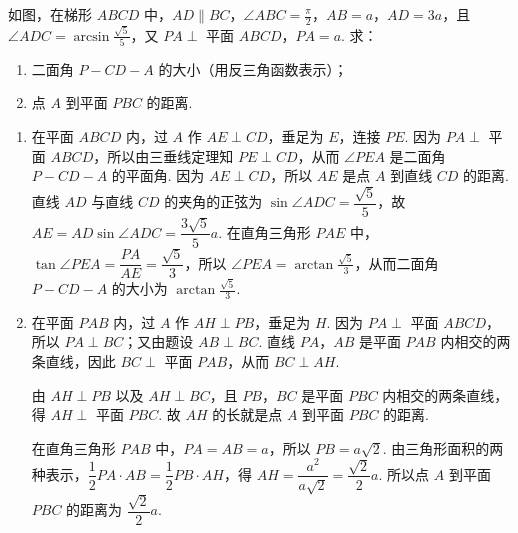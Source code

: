 \documentclass[UTF8,a4paper,oneside,11pt]{ctexbook}
\begin{document}
\begin{problem}
如图，在梯形 \(ABCD\) 中，\(AD \parallel BC\)，\(\angle ABC = \frac{\pi}{2}\)，\(AB = a\)，\(AD = 3a\)，且 \(\angle ADC = \arcsin \frac{\sqrt{5}}{5}\)，又 \(PA \perp\) 平面 \(ABCD\)，\(PA = a\). 求：

\begin{enumerate}
\item 二面角 \(P - CD - A\) 的大小（用反三角函数表示）；
\item 点 \(A\) 到平面 \(PBC\) 的距离.
\end{enumerate}

\end{problem}

\begin{solution}
\begin{enumerate}
\item 在平面 \(ABCD\) 内，过 \(A\) 作 \(AE \perp CD\)，垂足为 \(E\)，连接 \(PE\).
因为 \(PA \perp\) 平面 \(ABCD\)，所以由三垂线定理知 \(PE \perp CD\)，从而 \(\angle PEA\) 是二面角 \(P - CD - A\) 的平面角.
因为 \(AE\perp CD\)，所以 \(AE\) 是点 \(A\) 到直线 \(CD\) 的距离. 直线 \(AD\) 与直线 \(CD\) 的夹角的正弦为 \(\sin\angle ADC=\dfrac{\sqrt5}{5}\)，故 \(AE=AD\sin\angle ADC=\dfrac{3\sqrt5}{5}a\).
在直角三角形 \(PAE\) 中，\(\tan \angle PEA = \dfrac{PA}{AE} = \dfrac{\sqrt{5}}{3}\)，所以 \(\angle PEA = \arctan \frac{\sqrt{5}}{3}\)，从而二面角 \(P - CD - A\) 的大小为 \(\arctan \frac{\sqrt{5}}{3}\).

\item 在平面 \(PAB\) 内，过 \(A\) 作 \(AH \perp PB\)，垂足为 \(H\).
因为 \(PA \perp\) 平面 \(ABCD\)，所以 \(PA \perp BC\)；又由题设 \(AB \perp BC\). 直线 \(PA\)，\(AB\) 是平面 \(PAB\) 内相交的两条直线，因此 \(BC \perp\) 平面 \(PAB\)，从而 \(BC \perp AH\).

由 \(AH \perp PB\) 以及 \(AH \perp BC\)，且 \(PB\)，\(BC\) 是平面 \(PBC\) 内相交的两条直线，得 \(AH \perp\) 平面 \(PBC\). 故 \(AH\) 的长就是点 \(A\) 到平面 \(PBC\) 的距离.

在直角三角形 \(PAB\) 中，\(PA=AB=a\)，所以 \(PB=a\sqrt2\). 由三角形面积的两种表示，\(\dfrac12 PA\cdot AB=\dfrac12 PB\cdot AH\)，得 \(AH=\dfrac{a^2}{a\sqrt2}=\dfrac{\sqrt2}{2}a\). 所以点 \(A\) 到平面 \(PBC\) 的距离为 \(\dfrac{\sqrt2}{2}a\).
\end{enumerate}
\end{solution}
\end{document}
